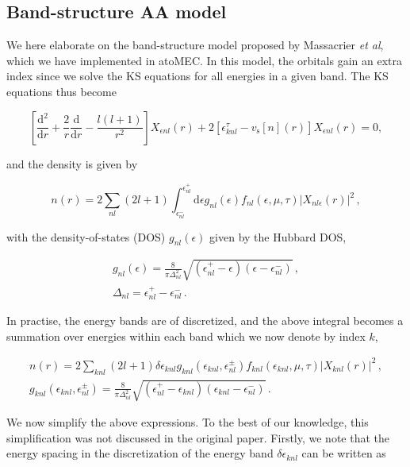 \documentclass[9pt]{article}
\begin{document}
\hypertarget{band-structure-aa-model}{%
\subsection{Band-structure AA model}\label{band-structure-aa-model}}

We here elaborate on the band-structure model proposed by Massacrier
\emph{et al}, which we have implemented in atoMEC. In this model, the
orbitals gain an extra index since we solve the KS equations for all
energies in a given band. The KS equations thus become

\begin{equation}
\left[\frac{\textrm{d}^2}{\textrm{d}r} + \frac{2}{r}\frac{\textrm{d}}{\textrm{d}r} - \frac{l(l+1)}{r^2} \right] X_{\epsilon nl}(r) + 2 \left[\epsilon^{\tau}_{knl} - v_\textrm{s}[n](r) \right] X_{\epsilon nl}(r) = 0,
\end{equation}

and the density is given by

\begin{equation}
    n(r) = 2\sum_{nl}(2l+1)
    \int_{\epsilon_{nl}^-}^{\epsilon_{nl}^+} \textrm{d}{\epsilon} g_{nl}(\epsilon) f_{nl}(\epsilon,\mu,\tau) |X_{nl\epsilon}(r)|^2\,,
\end{equation}

with the density-of-states (DOS) \(g_{nl}(\epsilon)\) given by the
Hubbard DOS,

\begin{gather}
g_{nl}(\epsilon) =\frac{8}{ \pi \Delta_{nl}^2} \sqrt{(\epsilon^+_{nl}-\epsilon)(\epsilon - \epsilon^-_{nl})}\,,\\
\Delta_{nl} = \epsilon^+_{nl}-\epsilon_{nl}^- \,.
\end{gather}

In practise, the energy bands are of discretized, and the above integral
becomes a summation over energies within each band which we now denote
by index \(k\),

\begin{gather}
 n(r) = 2\sum_{knl}(2l+1) \delta\epsilon_{knl} g_{knl}(\epsilon_{knl},\epsilon_{nl}^\pm) f_{knl}(\epsilon_{knl},\mu,\tau) |X_{knl}(r)|^2\,,\\
 g_{knl}(\epsilon_{knl},\epsilon_{nl}^\pm) =\frac{8}{ \pi \Delta_{nl}^2} \sqrt{(\epsilon^+_{nl}-\epsilon_{knl})(\epsilon_{knl} - \epsilon^-_{nl})}\,.
\end{gather}

We now simplify the above expressions. To the best of our knowledge,
this simplification was not discussed in the original paper. Firstly, we
note that the energy spacing in the discretization of the energy band
\(\delta\epsilon_{knl}\) can be written as
\end{document}
